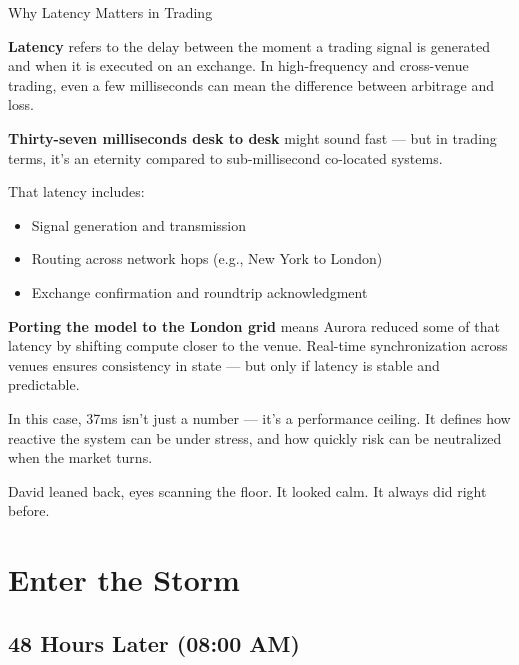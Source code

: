 \begin{TechnicalSidebar}{Why Latency Matters in Trading}

  \textbf{Latency} refers to the delay between the moment a trading signal is generated and when it is executed 
  on an exchange.  
  In high-frequency and cross-venue trading, even a few milliseconds can mean the difference between arbitrage 
  and loss.

  \medskip

  \textbf{Thirty-seven milliseconds desk to desk} might sound fast — but in trading terms, it’s an eternity 
  compared to sub-millisecond co-located systems.  

  \medskip

  That latency includes:

  \begin{itemize}
    \item Signal generation and transmission
    \item Routing across network hops (e.g., New York to London)
    \item Exchange confirmation and roundtrip acknowledgment
  \end{itemize}

  \medskip

  \textbf{Porting the model to the London grid} means Aurora reduced some of that latency by shifting compute 
  closer to the venue.  
  Real-time synchronization across venues ensures consistency in state — but only if latency is stable and 
  predictable.

  \medskip

  In this case, 37ms isn't just a number — it's a performance ceiling.  
  It defines how reactive the system can be under stress, and how quickly risk can be neutralized when the 
  market turns.

\end{TechnicalSidebar}

\medskip

David leaned back, eyes scanning the floor. It looked calm.
It always did right before.





\section{Enter the Storm}

\subsection{48 Hours Later (08:00 AM)}

